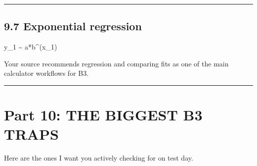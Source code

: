 \documentclass[
]{article}
\newenvironment{Shaded}{}{}
\newcommand{\NormalTok}[1]{#1}
\begin{document}
\begin{center}\rule{0.5\linewidth}{0.5pt}\end{center}

\subsection{9.7 Exponential regression}\label{exponential-regression}

\begin{Shaded}
\begin{Highlighting}[]
\NormalTok{y\_1 \textasciitilde{} a*b\^{}(x\_1)}
\end{Highlighting}
\end{Shaded}

Your source recommends regression and comparing fits as one of the main
calculator workflows for B3.

\begin{center}\rule{0.5\linewidth}{0.5pt}\end{center}

\section{Part 10: THE BIGGEST B3
TRAPS}\label{part-10-the-biggest-b3-traps}

Here are the ones I want you actively checking for on test day.
\end{document}
